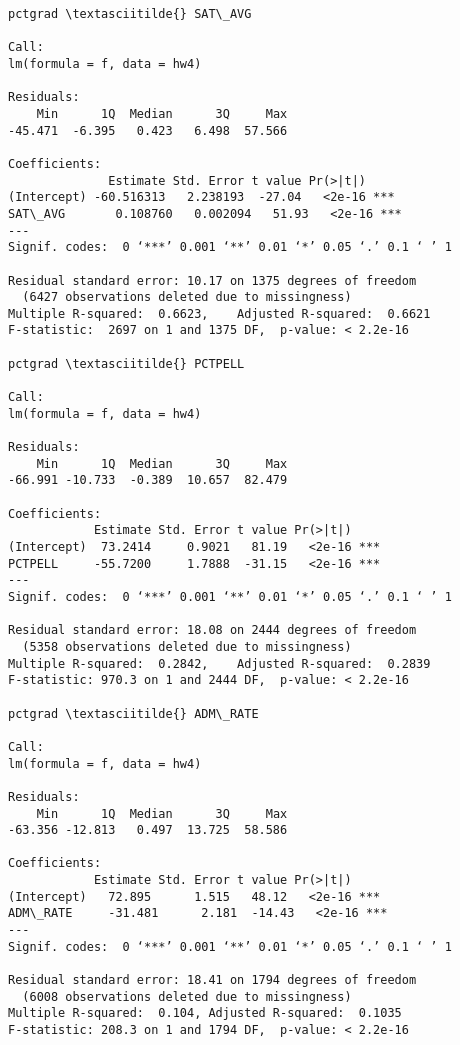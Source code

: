 \documentclass[11pt]{article}
\begin{document}
\begin{Verbatim}[commandchars=\\\{\}]
pctgrad \textasciitilde{} SAT\_AVG

Call:
lm(formula = f, data = hw4)

Residuals:
    Min      1Q  Median      3Q     Max 
-45.471  -6.395   0.423   6.498  57.566 

Coefficients:
              Estimate Std. Error t value Pr(>|t|)    
(Intercept) -60.516313   2.238193  -27.04   <2e-16 ***
SAT\_AVG       0.108760   0.002094   51.93   <2e-16 ***
---
Signif. codes:  0 ‘***’ 0.001 ‘**’ 0.01 ‘*’ 0.05 ‘.’ 0.1 ‘ ’ 1

Residual standard error: 10.17 on 1375 degrees of freedom
  (6427 observations deleted due to missingness)
Multiple R-squared:  0.6623,	Adjusted R-squared:  0.6621 
F-statistic:  2697 on 1 and 1375 DF,  p-value: < 2.2e-16

pctgrad \textasciitilde{} PCTPELL

Call:
lm(formula = f, data = hw4)

Residuals:
    Min      1Q  Median      3Q     Max 
-66.991 -10.733  -0.389  10.657  82.479 

Coefficients:
            Estimate Std. Error t value Pr(>|t|)    
(Intercept)  73.2414     0.9021   81.19   <2e-16 ***
PCTPELL     -55.7200     1.7888  -31.15   <2e-16 ***
---
Signif. codes:  0 ‘***’ 0.001 ‘**’ 0.01 ‘*’ 0.05 ‘.’ 0.1 ‘ ’ 1

Residual standard error: 18.08 on 2444 degrees of freedom
  (5358 observations deleted due to missingness)
Multiple R-squared:  0.2842,	Adjusted R-squared:  0.2839 
F-statistic: 970.3 on 1 and 2444 DF,  p-value: < 2.2e-16

pctgrad \textasciitilde{} ADM\_RATE

Call:
lm(formula = f, data = hw4)

Residuals:
    Min      1Q  Median      3Q     Max 
-63.356 -12.813   0.497  13.725  58.586 

Coefficients:
            Estimate Std. Error t value Pr(>|t|)    
(Intercept)   72.895      1.515   48.12   <2e-16 ***
ADM\_RATE     -31.481      2.181  -14.43   <2e-16 ***
---
Signif. codes:  0 ‘***’ 0.001 ‘**’ 0.01 ‘*’ 0.05 ‘.’ 0.1 ‘ ’ 1

Residual standard error: 18.41 on 1794 degrees of freedom
  (6008 observations deleted due to missingness)
Multiple R-squared:  0.104,	Adjusted R-squared:  0.1035 
F-statistic: 208.3 on 1 and 1794 DF,  p-value: < 2.2e-16


    \end{Verbatim}
\end{document}
